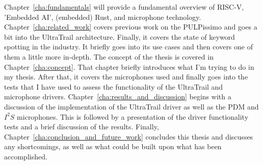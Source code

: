 Chapter~\ref{cha:fundamentals} will provide a fundamental overview of RISC-V, 'Embedded AI', (embedded) Rust, and microphone technology.\\
Chapter~\ref{cha:related_work} covers previous work on the PULPissimo and goes a bit into the UltraTrail architecture.
Finally, it covers the state of keyword spotting in the industry.
It briefly goes into its use cases and then covers one of them a little more in-depth.
The concept of the thesis is covered in Chapter~\ref{cha:concept}.
That chapter briefly introduces what I'm trying to do in my thesis.
After that, it covers the microphones used and finally goes into the tests that I have used
to assess the functionality of the UltraTrail and microphone drivers.
Chapter~\ref{cha:results_and_discussion} begins with a discussion of the implementation
of the UltraTrail driver as well as the PDM and $I^2S$ microphones.
This is followed by a presentation of the driver functionality tests and a brief discussion of the results.
Finally, Chapter~\ref{cha:conclusion_and_future_work} concludes this thesis and discusses any shortcomings,
as well as what could be built upon what has been accomplished.
